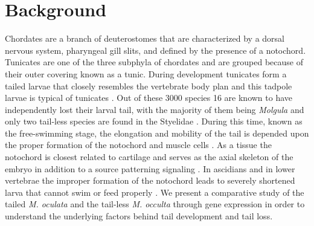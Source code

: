 \chapter{Background}
Chordates are a branch of deuterostomes that are characterized by a dorsal nervous system, pharyngeal gill slits, and defined by the presence of a notochord. Tunicates are one of the three subphyla of chordates and are grouped because of their outer covering known as a tunic. During development tunicates form a tailed larvae that closely resembles the vertebrate body plan \cite{jeffery_minireview_2002} and this tadpole larvae is typical of  tunicates \cite{huber_evolution_2000}. Out of these 3000 species 16 are known to have independently lost their larval tail, with the majority of them being \textit{Molgula} \cite{berrill_studies_1931,swalla_interspecific_1990} and only two tail-less species are found in the Styelidae \cite{huber_evolution_2000}. During this time, known as the free-swimming stage, the elongation and mobility of the tail is depended upon the proper formation of the notochord and muscle cells \cite{satoh_ascidian_2003}. As a tissue the notochord is closest related to cartilage and serves as the axial skeleton of the embryo in addition to a source patterning signaling \cite{jeffery_evolution_1999}. In ascidians and in lower vertebrae the improper formation of the notochord leads to severely shortened larva that cannot swim or feed properly \cite{di_gregorio_tail_2002,jiang_ascidian_2005,stemple_structure_2005}. We present a comparative study of the tailed \textit{M. oculata} and the tail-less \textit{M. occulta} through gene expression in order to understand the underlying factors behind tail development and tail loss.

